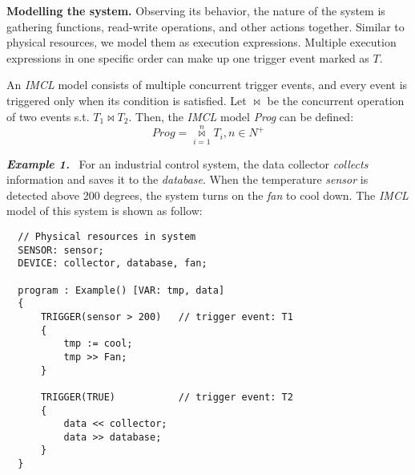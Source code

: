 \textbf{Modelling the system. }
Observing its behavior, the nature of the system is gathering functions, read-write operations, and other actions together. Similar to physical resources, we model them as execution expressions. Multiple execution expressions in one specific order can make up one trigger event marked as $T$.

An \emph{IMCL} model consists of multiple concurrent trigger events, and every event is triggered only when its condition is satisfied. Let $\bowtie$ be the concurrent operation of two events s.t. $T_1\bowtie T_2$. Then, the \emph{IMCL} model \emph{Prog} can be defined:
\begin{displaymath}
Prog = \overset{n}{\underset{i=1}{\bowtie}} T_{i}, n \in N^{+}
\end{displaymath}


\textbf{\emph{Example 1.}} \ For an industrial control system, the data collector \emph{collects} information and saves it to the \emph{database}. When the temperature \emph{sensor} is detected above 200 degrees, the system turns on the \emph{fan} to cool down. The \emph{IMCL} model of this system is shown as follow:

{}
\linespread{0.65}
\begin{lstlisting}
  // Physical resources in system
  SENSOR: sensor;
  DEVICE: collector, database, fan;

  program : Example() [VAR: tmp, data]
  {
      TRIGGER(sensor > 200)   // trigger event: T1
      {
          tmp := cool;
          tmp >> Fan;
      }

      TRIGGER(TRUE)           // trigger event: T2
      {
          data << collector;
          data >> database;
      }
  }
\end{lstlisting}


